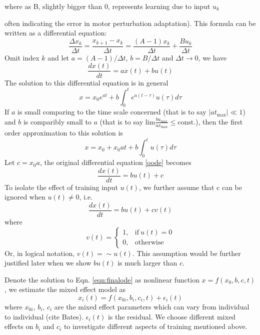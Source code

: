 where as B, slightly bigger than 0, represents learning due to input $ u_k $ {often indicating the error in motor perturbation adaptation).
This formula can be written as a differential equation:
\begin{equation}
\frac{\Delta x_k}{\Delta t} = \frac{x_{k+1}-x_k}{\Delta t} = \frac{(A-1)x_k}{\Delta t} + \frac{Bu_k}{\Delta t}
\end{equation}
Omit index $ k $ and let $ a = (A-1)/\Delta t $, $ b = B/\Delta t $ and $ \Delta t\rightarrow 0 $, we have
\begin{equation}\label{oode}
\frac{dx(t)}{dt} = ax(t)+bu(t)
\end{equation}
The solution to this differential equation is in general
\begin{equation}\label{generalsolution}
x = x_0e^{at} + b\int_0^t e^{a(t-\tau)}u(\tau)d\tau
\end{equation}
If $ a $ is small comparing to the time scale concerned (that is to say $ |at_{\text{max}}| \ll 1 $) and $ b $ is comparibly small to $ a $ (that is to say $ \text{lim}\frac{bu_\text{max}}{ax_\text{max}} \leqslant \text{const.} $), then the first order approximation to this solution is
\begin{equation}\label{specialsolution}
x = x_0 + x_0at + b \int_0^t u(\tau)d\tau
\end{equation}
Let $ c=x_0 a $, the original differential equation \ref{oode} becomes
\begin{equation}
\frac{dx(t)}{dt} = bu(t) + c
\end{equation}
To isolate the effect of training input $ u(t) $, we further assume that c can be ignored when $ u(t) \neq 0 $, i.e.
\begin{equation}\label{eqn:finalode2}
\frac{dx(t)}{dt} = bu(t) + cv(t)
\end{equation}
where
\begin{equation}
v(t) = 
\begin{cases}
1, & \text{if}\ u(t) = 0 \\
0, & \text{otherwise}
\end{cases}
\end{equation}
Or, in logical notation, $ v(t) = \sim u(t) $. 
This assumption would be further justified later when we show $ bu(t) $ is much larger than $ c $.

Denote the solution to Eqn. \ref{eqn:finalode} as nonlinear function $ x=f(x_0,b,c,t) $, we estimate the mixed effect model as
\begin{equation}
x_i (t)=f(x_{0i},b_i,c_i,t) + \epsilon_i (t)
\end{equation}
where $ x_{0i} $, $ b_i $, $ c_i $ are the mixed effect parameters which can vary from individual to individual (cite Bates).
$ \epsilon_i (t) $ is the residual. 
We choose different mixed effects on $ b_i $ and $ c_i $ to investigate different aspects of training mentioned above.

}
